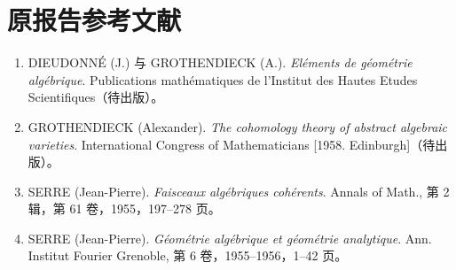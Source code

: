 \section*{原报告参考文献}
\begin{enumerate}
\item[{[1]}]\label{fga2-bib-1} DIEUDONNÉ (J.) 与 GROTHENDIECK (A.). \emph{Eléments de géométrie algébrique}. Publications mathématiques de l'Institut des Hautes Etudes Scientifiques（待出版）。
\item[{[2]}]\label{fga2-bib-2} GROTHENDIECK (Alexander). \emph{The cohomology theory of abstract algebraic varieties}. International Congress of Mathematicians [1958. Edinburgh]（待出版）。
\item[{[3]}]\label{fga2-bib-3} SERRE (Jean-Pierre). \emph{Faisceaux algébriques cohérents}. Annals of Math., 第 2 辑，第 61 卷，1955，197--278 页。
\item[{[4]}]\label{fga2-bib-4} SERRE (Jean-Pierre). \emph{Géométrie algébrique et géométrie analytique}. Ann. Institut Fourier Grenoble, 第 6 卷，1955--1956，1--42 页。
\end{enumerate}
